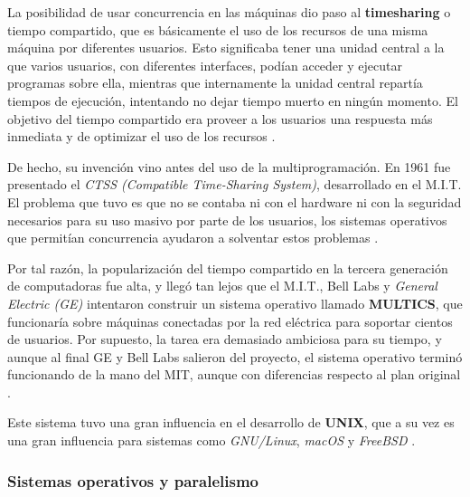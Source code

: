 \documentclass[letterpaper,12pt,oneside]{book}
\begin{document}
		La posibilidad de usar concurrencia en las máquinas dio paso al \textbf{timesharing} o tiempo compartido, que es básicamente el uso de los 
		recursos de una misma máquina por diferentes usuarios. Esto significaba tener una unidad central a la que varios usuarios, con diferentes interfaces, podían acceder y ejecutar programas
        sobre ella, mientras que internamente la unidad central repartía tiempos de ejecución, intentando no dejar tiempo muerto en ningún momento. 
        El objetivo del tiempo compartido era proveer a los usuarios una respuesta más inmediata y de optimizar el uso de los recursos \cite{tanenbaum_modern_2002}.
     
	    De hecho, su invención vino antes del uso de la multiprogramación. En 1961 fue presentado el \textit{CTSS (Compatible Time-Sharing System)}, desarrollado
	    en el M.I.T. El problema que tuvo es que no se contaba ni con el hardware ni con la seguridad necesarios para su uso masivo por parte de los usuarios,
		los sistemas operativos que permitían concurrencia ayudaron a solventar estos problemas \cite{tanenbaum_modern_2002}.
     
        Por tal razón, la popularización del tiempo compartido en la tercera generación de computadoras
	    fue alta, y llegó tan lejos que el M.I.T., Bell Labs y \textit{ General Electric (GE)} intentaron construir un sistema operativo llamado \textbf{MULTICS}, que funcionaría sobre máquinas conectadas por 
	    la red eléctrica para soportar cientos de usuarios. Por supuesto, la tarea era demasiado ambiciosa para su tiempo, y aunque al final GE y Bell Labs
	    salieron del proyecto, el sistema operativo terminó funcionando de la mano del MIT, aunque con diferencias respecto al plan original \cite{tanenbaum_modern_2002}.
     
        Este sistema tuvo una gran influencia en el desarrollo de \textbf{UNIX}, que
	    a su vez es una gran influencia para sistemas como \textit{GNU/Linux}, \textit{macOS} y \textit{FreeBSD} \cite{tanenbaum_modern_2002}.
		
        \subsubsection{Sistemas operativos y paralelismo}
        
\end{document}
